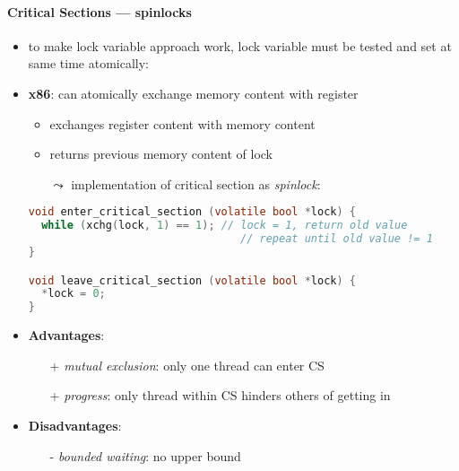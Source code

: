 \paragraph{Critical Sections --- spinlocks}
\begin{itemize}
  \item to make lock variable approach work, lock variable must be tested and set at same time atomically:
  \item \textbf{x86}:  can atomically exchange memory content with register
  \begin{itemize}
    \item exchanges register content with memory content
    \item returns previous memory content of lock
    \item[$ \leadsto $] implementation of critical section as \emph{spinlock}:
  \end{itemize}
  \begin{lstlisting}[language=c]
void enter_critical_section (volatile bool *lock) {
  while (xchg(lock, 1) == 1); // lock = 1, return old value
                                 // repeat until old value != 1
}

void leave_critical_section (volatile bool *lock) {
  *lock = 0;
}
  \end{lstlisting}
  \item \textbf{Advantages}:
  \begin{itemize}
    \item[+] \emph{mutual exclusion}: only one thread can enter CS
    \item[+] \emph{progress}: only thread within CS hinders others of getting in
  \end{itemize}
  \item \textbf{Disadvantages}:
  \begin{itemize}
    \item[-] \emph{bounded waiting}: no upper bound
  \end{itemize}
\end{itemize}

